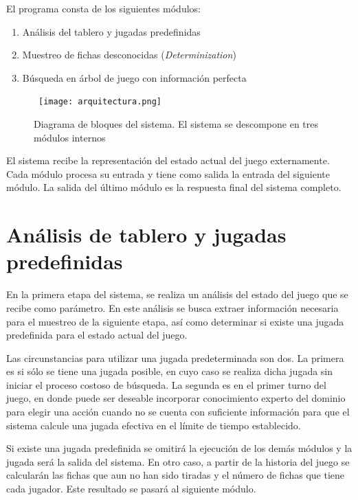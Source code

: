 El programa consta de los siguientes módulos:

\begin{enumerate}
   \item Análisis del tablero y jugadas predefinidas
   \item Muestreo de fichas desconocidas (\textit{Determinization})
   \item Búsqueda en árbol de juego con información perfecta
\end{enumerate}


\begin{figure}[ht]
   \begin{center}
      \hbox{\hspace{-5em} \texttt{[image: arquitectura.png]}}
      \caption{Diagrama de bloques del sistema. El sistema se descompone en tres módulos internos}
      \label{ARQ}
   \end{center}
\end{figure}
El sistema recibe la representación del estado actual del juego externamente.
Cada módulo procesa su entrada y tiene como salida la entrada del siguiente
módulo. La salida del último módulo es la respuesta final del sistema completo.

\section{Análisis de tablero y jugadas predefinidas}

En la primera etapa del sistema, se realiza un análisis del estado del juego que
se recibe como parámetro. En este análisis se busca extraer información
necesaria para el muestreo de la siguiente etapa, así como determinar si existe
una jugada predefinida para el estado actual del juego.

Las circunstancias para utilizar una jugada predeterminada son dos. La primera
es si sólo se tiene una jugada posible, en cuyo caso se realiza dicha jugada sin
iniciar el proceso costoso de búsqueda. La segunda es en el primer turno del
juego, en donde puede ser deseable incorporar conocimiento experto del dominio
para elegir una acción cuando no se cuenta con suficiente información para que
el sistema calcule una jugada efectiva en el límite de tiempo establecido.

Si existe una jugada predefinida se omitirá la ejecución de los demás módulos y
la jugada será la salida del sistema. En otro caso, a partir de la historia del
juego se calcularán las fichas que aun no han sido tiradas y el número de fichas
que tiene cada jugador. Este resultado se pasará al siguiente módulo.

